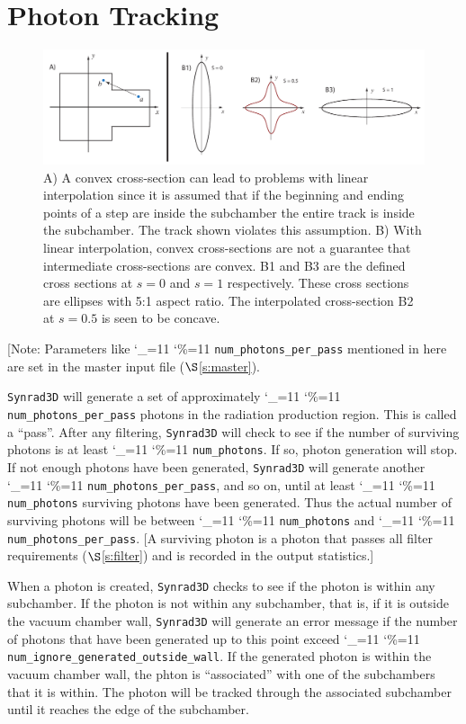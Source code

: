 \documentclass[11pt,openany]{report}
\newcommand{\sref}[1]{$\S$\ref{#1}}
\newcommand{\srthree}{\texttt{Synrad3D}\xspace}
\newcommand\ttcmd{\begingroup\catcode`\_=11 \catcode`\%=11 \dottcmd}
\newcommand\dottcmd[1]{\texttt{#1}\endgroup}
\newcommand{\vn}{\ttcmd}
\begin{document}
\section{Photon Tracking}
\label{s:track}

\begin{figure}[tb]
\begin{center}
\includegraphics[width=6in]{chamber-problem.pdf} \caption{A) A convex cross-section can
lead to problems with linear interpolation since it is assumed that if the beginning and
ending points of a step are inside the subchamber the entire track is inside the
subchamber. The track shown violates this assumption.  B) With linear interpolation,
convex cross-sections are not a guarantee that intermediate cross-sections are convex. B1
and B3 are the defined cross sections at $s = 0$ and $s = 1$ respectively. These cross
sections are ellipses with 5:1 aspect ratio. The interpolated cross-section B2 at $s =
0.5$ is seen to be concave.}  \label{f:convex-chamber}
\end{center}
\end{figure}

[Note: Parameters like \vn{num_photons_per_pass} mentioned in here are set in the master input file
(\sref{s:master}).

\srthree will generate a set of approximately \vn{num_photons_per_pass} photons in the radiation
production region.  This is called a ``pass''.  After any filtering, \srthree will check to see if
the number of surviving photons is at least \vn{num_photons}.  If so, photon generation will
stop. If not enough photons have been generated, \srthree will generate another
\vn{num_photons_per_pass}, and so on, until at least \vn{num_photons} surviving photons have been
generated. Thus the actual number of surviving photons will be between \vn{num_photons} and
\vn{num_photons_per_pass}. [A surviving photon is a photon that passes all filter requirements
(\sref{s:filter}) and is recorded in the output statistics.]

When a photon is created, \srthree checks to see if the photon is within any
subchamber. If the photon is not within any subchamber, that is, if it is outside the
vacuum chamber wall, \srthree will generate an error message if the number of photons that
have been generated up to this point exceed \vn{num_ignore_generated_outside_wall}. If
the generated photon is within the vacuum chamber wall, the phton is ``associated'' with
one of the subchambers that it is within.  The photon will be tracked through the
associated subchamber until it reaches the edge of the subchamber.
\end{document}
